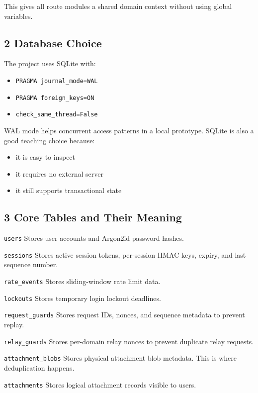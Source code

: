 \documentclass[11pt,a4paper]{article}
\begin{document}
This gives all route modules a shared domain context without using global variables.

\subsection{2 Database Choice}

The project uses SQLite with:

\begin{itemize}
\item \nolinkurl{PRAGMA journal_mode=WAL}
\item \nolinkurl{PRAGMA foreign_keys=ON}
\item \nolinkurl{check_same_thread=False}
\end{itemize}

WAL mode helps concurrent access patterns in a local prototype. SQLite is also a good teaching choice because:

\begin{itemize}
\item it is easy to inspect
\item it requires no external server
\item it still supports transactional state
\end{itemize}

\subsection{3 Core Tables and Their Meaning}

\nolinkurl{users} Stores user accounts and Argon2id password hashes.

\nolinkurl{sessions} Stores active session tokens, per-session HMAC keys, expiry, and last sequence number.

\nolinkurl{rate_events} Stores sliding-window rate limit data.

\nolinkurl{lockouts} Stores temporary login lockout deadlines.

\nolinkurl{request_guards} Stores request IDs, nonces, and sequence metadata to prevent replay.

\nolinkurl{relay_guards} Stores per-domain relay nonces to prevent duplicate relay requests.

\nolinkurl{attachment_blobs} Stores physical attachment blob metadata. This is where deduplication happens.

\nolinkurl{attachments} Stores logical attachment records visible to users.
\end{document}
